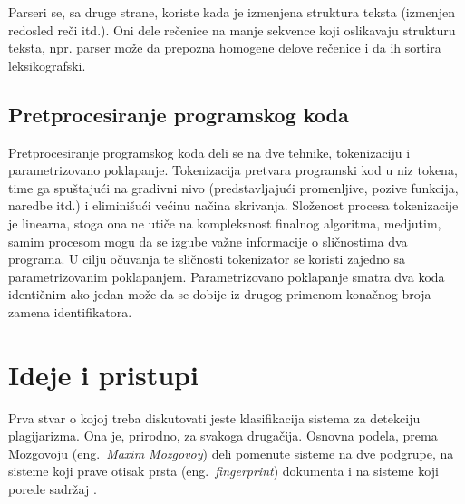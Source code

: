 \documentclass[a4paper]{article}
\begin{document}
\par Parseri se, sa druge strane, koriste kada je izmenjena struktura teksta (izmenjen redosled reči itd.). Oni dele rečenice na manje sekvence koji oslikavaju strukturu teksta, npr. parser može da prepozna homogene delove rečenice i da ih sortira leksikografski.

\subsection{Pretprocesiranje programskog koda}
\label{subsec:pretprocesiranje programskog koda}

Pretprocesiranje programskog koda deli se na dve tehnike, tokenizaciju i parametrizovano poklapanje. Tokenizacija pretvara programski kod u niz tokena, time ga spuštajući na gradivni nivo (predstavljajući promenljive, pozive funkcija, naredbe itd.) i eliminišući većinu načina skrivanja. Složenost procesa tokenizacije je linearna, stoga ona ne utiče na kompleksnost finalnog algoritma, medjutim, samim procesom mogu da se izgube važne informacije o sličnostima dva programa. U cilju očuvanja te sličnosti tokenizator se koristi zajedno sa parametrizovanim poklapanjem. Parametrizovano poklapanje smatra dva koda identičnim ako jedan može da se dobije iz drugog primenom konačnog broja zamena identifikatora.

\section{Ideje i pristupi}
\label{sec:ideje i pristupi}

Prva stvar o kojoj treba diskutovati jeste klasifikacija sistema za detekciju plagijarizma. Ona je, prirodno, za svakoga drugačija. Osnovna podela, prema Mozgovoju (eng.~{\em Maxim Mozgovoy}) \cite{mozgovoy} deli pomenute sisteme na dve podgrupe, na sisteme koji prave otisak prsta (eng.~{\em fingerprint}) dokumenta i na sisteme koji porede sadržaj \cite{cosma}.
\end{document}
